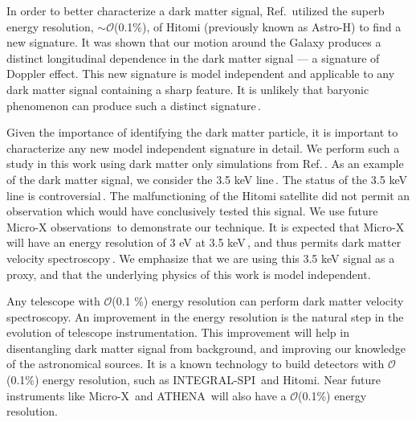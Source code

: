 \documentclass[aps,prl,10pt,twocolumn,superscriptaddress,showpacs]{revtex4-1}
\begin{document}
In order to better characterize a dark matter signal, Ref.\,\cite{speckhard2016} utilized the superb energy resolution, $\sim \mathcal{O}$(0.1\%), of Hitomi (previously known as Astro-H) to find a new signature.  It was shown that our motion around the Galaxy produces a distinct longitudinal dependence in the dark matter signal --- a signature of Doppler effect.  This new signature is model independent and applicable to any dark matter signal containing a sharp feature.  It is unlikely that baryonic phenomenon can produce such a distinct signature\,\cite{speckhard2016}.

Given the importance of identifying the dark matter particle, it is important to characterize any new model independent signature in detail.  We perform such a study in this work using dark matter only simulations from Ref.\,\cite{mao2015}.  As an example of the dark matter signal, we consider the 3.5 keV line\,\cite{Bulbul:2014sua,Boyarsky:2014jta}.  The status of the 3.5 keV line is controversial\,\cite{Iakubovskyi:2015wma,Jeltema:2015mee,Ruchayskiy:2015onc,Bulbul:2016yop,Aharonian:2016gzq,Hofmann:2016urz,Conlon:2016lxl}.  The malfunctioning of the Hitomi satellite did not permit an observation which would have conclusively tested this signal.  We use future Micro-X observations\,\cite{Figueroa-Feliciano:2015gwa} to demonstrate our technique.  It is expected that Micro-X will have an energy resolution of 3 eV at 3.5 keV\,\cite{Figueroa-Feliciano:2015gwa}, and thus permits dark matter velocity spectroscopy\,\cite{speckhard2016}.  We emphasize that we are using this 3.5 keV signal as a proxy, and that the underlying physics of this work is model independent.  

Any telescope with $\mathcal{O}$(0.1 \%) energy resolution can perform dark matter velocity spectroscopy.  An improvement in the energy resolution is the natural step in the evolution of telescope instrumentation.  This improvement will help in disentangling dark matter signal from background, and improving our knowledge of the astronomical sources.  It is a known technology to build detectors with $\mathcal{O}$(0.1\%) energy resolution, such as INTEGRAL-SPI\,\cite{2003AA} and Hitomi.  Near future instruments like Micro-X\,\cite{Figueroa-Feliciano:2015gwa} and ATHENA\,\cite{Barret:2016ett} will also have a $\mathcal{O}$(0.1\%) energy resolution.

\end{document}
